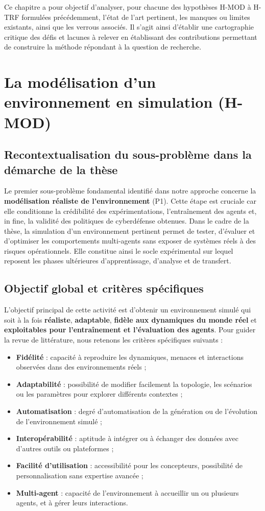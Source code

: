 Ce chapitre a pour objectif d'analyser, pour chacune des hypothèses H-MOD à H-TRF formulées précédemment, l'état de l'art pertinent, les manques ou limites existants, ainsi que les verrous associés. Il s'agit ainsi d'établir une cartographie critique des défis et lacunes à relever en établissant des contributions permettant de construire la méthode répondant à la question de recherche.


\section{La modélisation d'un environnement en simulation (H-MOD)}




\subsection*{Recontextualisation du sous-problème dans la démarche de la thèse}

Le premier sous-problème fondamental identifié dans notre approche concerne la \textbf{modélisation réaliste de l’environnement} (P1). Cette étape est cruciale car elle conditionne la crédibilité des expérimentations, l’entraînement des agents et, in fine, la validité des politiques de cyberdéfense obtenues. Dans le cadre de la thèse, la simulation d’un environnement pertinent permet de tester, d’évaluer et d’optimiser les comportements multi-agents sans exposer de systèmes réels à des risques opérationnels. Elle constitue ainsi le socle expérimental sur lequel reposent les phases ultérieures d’apprentissage, d’analyse et de transfert. \subsection*{Objectif global et critères spécifiques} L’objectif principal de cette activité est d’obtenir un environnement simulé qui soit à la fois \textbf{réaliste}, \textbf{adaptable}, \textbf{fidèle aux dynamiques du monde réel} et \textbf{exploitables pour l’entraînement et l’évaluation des agents}. Pour guider la revue de littérature, nous retenons les critères spécifiques suivants :
%
\begin{itemize}
  \item \textbf{Fidélité} : capacité à reproduire les dynamiques, menaces et interactions observées dans des environnements réels ;
  \item \textbf{Adaptabilité} : possibilité de modifier facilement la topologie, les scénarios ou les paramètres pour explorer différents contextes ;
  \item \textbf{Automatisation} : degré d’automatisation de la génération ou de l’évolution de l’environnement simulé ;
  \item \textbf{Interopérabilité} : aptitude à intégrer ou à échanger des données avec d’autres outils ou plateformes ;
  \item \textbf{Facilité d’utilisation} : accessibilité pour les concepteurs, possibilité de personnalisation sans expertise avancée ;
  \item \textbf{Multi-agent} : capacité de l’environnement à accueillir un ou plusieurs agents, et à gérer leurs interactions.
\end{itemize}

